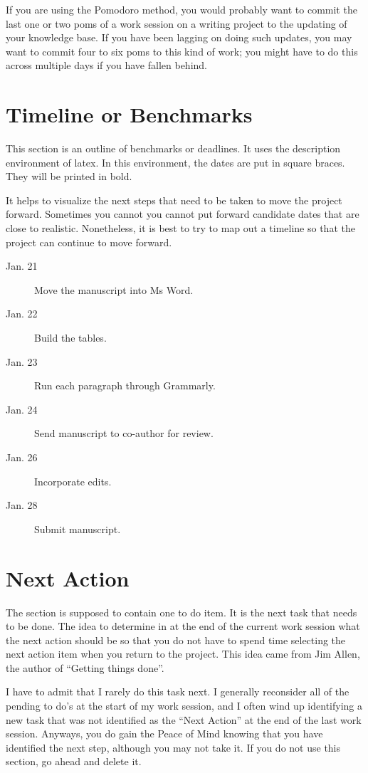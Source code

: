\documentclass[10pt,letterpaper]{article}
\begin{document}
If you are using the Pomodoro method, you would probably want to commit the last one or two poms of a work session on a writing project to the updating of your knowledge base.
If you have been lagging on doing such updates, you may want to commit four to six poms to this kind of work; you might have to do this across multiple days if you have fallen behind.


\section{Timeline or Benchmarks}
This section is an outline of benchmarks or deadlines.
It uses the description environment of latex.
In this environment, the dates are put in square braces.
They will be printed in bold.

It helps to visualize the next steps that need to be taken to move the project forward.
Sometimes you cannot you cannot put forward candidate dates that are close to realistic.
Nonetheless, it is best to try to map out a timeline so that the project can continue to move forward.

\begin{description}
\item [Jan. 21] Move the manuscript into Ms Word.
\item [Jan. 22] Build the tables.
\item [Jan. 23] Run each paragraph through Grammarly.
\item [Jan. 24] Send manuscript to co-author for review.
\item [Jan. 26] Incorporate edits.
\item [Jan. 28] Submit manuscript. 
\end{description}



\section{Next Action}
The section is supposed to contain one to do item.
It is the next task that needs to be done.
The idea to determine in at the end of the current work session what the next action should be so that you do not have to spend time selecting the next action item when you return to the project.
This idea came from Jim Allen, the author of ``Getting things done''.

I have to admit that I rarely do this task next. 
I generally reconsider all of the pending to do's at the start of my work session, and I often wind up identifying a new task that was not identified as the ``Next Action'' at the end of the last work session.
Anyways, you do gain the Peace of Mind knowing that you have identified the next step, although you may not take it.
If you do not use this section, go ahead and delete it.
\end{document}
